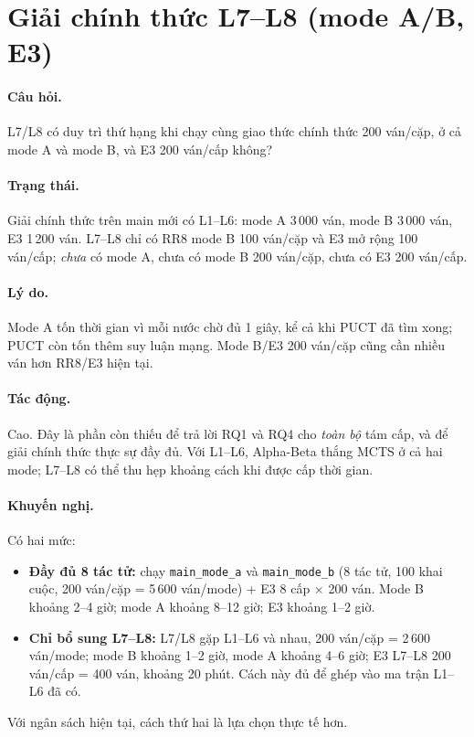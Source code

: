 \section{Giải chính thức L7--L8 (mode A/B, E3)}
\paragraph{Câu hỏi.} L7/L8 có duy trì thứ hạng khi chạy cùng giao thức chính thức 200 ván/cặp,
ở cả mode A và mode B, và E3 200 ván/cấp không?
\paragraph{Trạng thái.} Giải chính thức trên main mới có L1--L6: mode A 3\,000 ván, mode B
3\,000 ván, E3 1\,200 ván. L7--L8 chỉ có RR8 mode B 100 ván/cặp và E3 mở rộng 100 ván/cấp;
\emph{chưa} có mode A, chưa có mode B 200 ván/cặp, chưa có E3 200 ván/cấp.
\paragraph{Lý do.} Mode A tốn thời gian vì mỗi nước chờ đủ 1 giây, kể cả khi PUCT đã tìm xong;
PUCT còn tốn thêm suy luận mạng. Mode B/E3 200 ván/cặp cũng cần nhiều ván hơn RR8/E3 hiện tại.
\paragraph{Tác động.} Cao. Đây là phần còn thiếu để trả lời RQ1 và RQ4 cho \emph{toàn bộ} tám
cấp, và để giải chính thức thực sự đầy đủ. Với L1--L6, Alpha-Beta thắng MCTS ở cả hai mode;
L7--L8 có thể thu hẹp khoảng cách khi được cấp thời gian.
\paragraph{Khuyến nghị.} Có hai mức:
\begin{itemize}
  \item \textbf{Đầy đủ 8 tác tử:} chạy \texttt{main\_mode\_a} và \texttt{main\_mode\_b} (8 tác
        tử, 100 khai cuộc, 200 ván/cặp = 5\,600 ván/mode) + E3 8 cấp × 200 ván. Mode B khoảng
        2--4 giờ; mode A khoảng 8--12 giờ; E3 khoảng 1--2 giờ.
  \item \textbf{Chỉ bổ sung L7--L8:} L7/L8 gặp L1--L6 và nhau, 200 ván/cặp = 2\,600 ván/mode;
        mode B khoảng 1--2 giờ, mode A khoảng 4--6 giờ; E3 L7--L8 200 ván/cấp = 400 ván, khoảng
        20 phút. Cách này đủ để ghép vào ma trận L1--L6 đã có.
\end{itemize}
Với ngân sách hiện tại, cách thứ hai là lựa chọn thực tế hơn.

